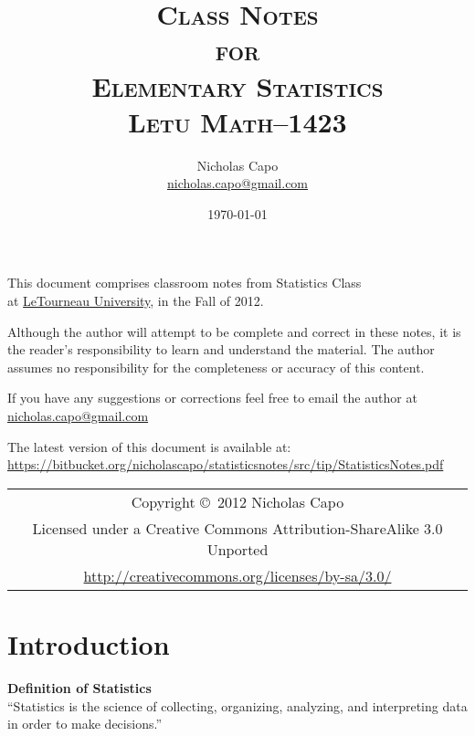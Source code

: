 \documentclass{book}
\title{\textsc{Class Notes\\ for \\ Elementary Statistics\\ Letu Math--1423}}
\author{Nicholas Capo\\ \href{mailto:nicholas.capo@gmail.com}{nicholas.capo@gmail.com}}
\date{\today\\ \currenttime}
\begin{document}
\maketitle

\section*{}
\begin{center}
This document comprises classroom notes from Statistics Class\\ at \href{letu.edu}{LeTourneau University}, in the Fall of 2012.

\vspace{10pt}

Although the author will attempt to be complete and correct in these notes, it is the reader's responsibility to learn and understand the material. The author assumes no responsibility for the completeness or accuracy of this content. 

\vspace{10pt}

If you have any suggestions  or corrections feel free to email the author at \href{mailto:nicholas.capo@gmail.com}{nicholas.capo@gmail.com}

\vspace{10pt}

The latest version of this document is available at:\\ \url{https://bitbucket.org/nicholascapo/statisticsnotes/src/tip/StatisticsNotes.pdf}
\end{center}

\vfill
\begin{tabular}{c}
Copyright \copyright\ 2012 Nicholas Capo\\
Licensed under a {Creative Commons Attribution-ShareAlike 3.0 Unported}\\
\url{http://creativecommons.org/licenses/by-sa/3.0/}\\
\end{tabular}

\tableofcontents

\chapter{Introduction}
\begin{center}
\textbf{Definition of Statistics}\\
\enquote{Statistics is the science of collecting, organizing, analyzing, and interpreting data in order to make decisions.}
\end{center}
\end{document}
